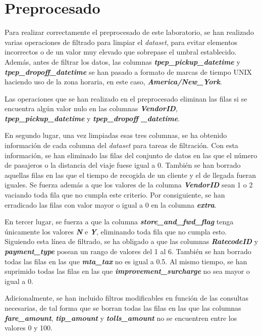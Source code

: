 \section{Preprocesado}

Para realizar correctamente el preprocesado de este laboratorio, se han realizado varias operaciones de filtrado para limpiar el \textit{dataset}, para evitar elementos incorrectos o de un valor muy elevado que sobrepase el umbral establecido. Además, antes de filtrar los datos, las columnas \textbf{\textit{tpep\_pickup\_datetime}} y \textbf{\textit{tpep\_dropoff\_datetime}} se han pasado a formato de marcas de tiempo UNIX haciendo uso de la zona horaria, en este caso, \textbf{\textit{America/New\_York}}.

Las operaciones que se han realizado en el preprocesado eliminan las filas si se encuentra algún valor nulo en las columnas \textbf{\textit{VendorID}}, \textbf{\textit{tpep\_pickup\_datetime}} y \textbf{\textit{tpep\_dropoff
\_datetime}}.

En segundo lugar, una vez limpiadas esas tres columnas, se ha obtenido información de cada columna del \textit{dataset} para tareas de filtración. Con esta información, se han eliminado las filas del conjunto de datos en las que el número de pasajeros o la distancia del viaje fuese igual a 0. También se han borrado aquellas filas en las que el tiempo de recogida de un cliente y el de llegada fueran iguales. Se fuerza además a que los valores de la columna \textbf{\textit{VendorID}} sean 1 o 2 vaciando toda fila que no cumpla este criterio. Por consiguiente, se han erradicado las filas con valor mayor o igual a 0 en la columna \textbf{\textit{extra}}.

En tercer lugar, se fuerza a que la columna \textbf{\textit{store\_and\_fwd\_flag}} tenga únicamente los valores \textbf{\textit{N}} e \textbf{\textit{Y}}, eliminando toda fila que no cumpla esto. Siguiendo esta línea de filtrado, se ha obligado a que las columnas \textbf{\textit{RatecodeID}} y \textbf{\textit{payment\_type}} posean un rango de valores del 1 al 6. También se han borrado todas las filas en las que \textbf{\textit{mta\_tax}} no es igual a 0.5. Al mismo tiempo, se han suprimido todas las filas en las que \textbf{\textit{improvement\_surcharge}} no sea mayor o igual a 0.

Adicionalmente, se han incluido filtros modificables en función de las consultas necesarias, de tal forma que se borran todas las filas en las que las columnas \textbf{\textit{fare\_amount}}, \textbf{\textit{tip\_amount}} y \textbf{\textit{tolls\_amount}} no se encuentren entre los valores 0 y 100.
